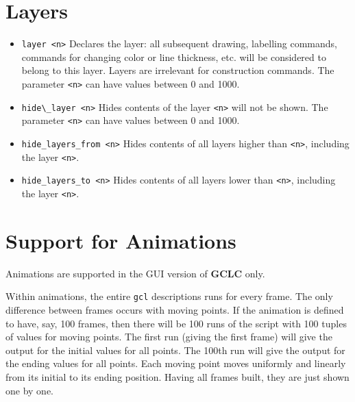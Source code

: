 \documentclass[a4paper]{book}
\newcommand{\gclc}{{\bfseries GCLC}\xspace}
\begin{document}
\section{Layers}
\label{subsec:layers}


\begin{itemize}
\item \verb|layer <n>|
        Declares the layer: all subsequent drawing, labelling commands,
        commands for changing color or line thickness, etc. will be
        considered to belong to this layer. Layers are irrelevant for
        construction commands. The parameter \verb|<n>| can have values
        between 0 and 1000.

\item \verb|hide\_layer <n>|
        Hides contents of the layer \verb|<n>| will not be shown.
        The parameter \verb|<n>| can have values between 0 and 1000.

\item \verb|hide_layers_from <n>|
        Hides contents of all layers higher than \verb|<n>|, including
        the layer \verb|<n>|.

\item \verb|hide_layers_to <n>|
        Hides contents of all layers lower than \verb|<n>|, including
        the layer \verb|<n>|.
\end{itemize}




\section{Support for Animations}
\label{subsec:animations}

Animations are supported in the GUI version of \gclc only.

Within animations, the entire \verb|gcl| descriptions runs for
every frame. The only difference between frames occurs with moving
points. If the animation is defined to have, say, 100 frames,
then there will be 100 runs of the script with 100 tuples of
values for moving points. The first run (giving the first frame)
will give the output for the initial values for all points. The 100th
run will give the output for the ending values for all points.
Each moving point moves uniformly and linearly from its initial
to its ending position. Having all frames built, they are just
shown one by one.
\end{document}
